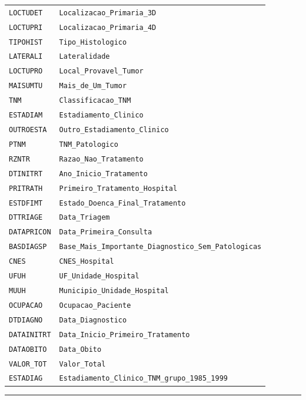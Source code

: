 \documentclass[
  brazilian,
  a4paper,
  oneside]{scrbook}
\begin{document}
\begin{longtable}[]{@{}ll@{}}
\texttt{LOCTUDET} & \texttt{Localizacao\_Primaria\_3D} \\
\texttt{LOCTUPRI} & \texttt{Localizacao\_Primaria\_4D} \\
\texttt{TIPOHIST} & \texttt{Tipo\_Histologico} \\
\texttt{LATERALI} & \texttt{Lateralidade} \\
\texttt{LOCTUPRO} & \texttt{Local\_Provavel\_Tumor} \\
\texttt{MAISUMTU} & \texttt{Mais\_de\_Um\_Tumor} \\
\texttt{TNM} & \texttt{Classificacao\_TNM} \\
\texttt{ESTADIAM} & \texttt{Estadiamento\_Clinico} \\
\texttt{OUTROESTA} & \texttt{Outro\_Estadiamento\_Clinico} \\
\texttt{PTNM} & \texttt{TNM\_Patologico} \\
\texttt{RZNTR} & \texttt{Razao\_Nao\_Tratamento} \\
\texttt{DTINITRT} & \texttt{Ano\_Inicio\_Tratamento} \\
\texttt{PRITRATH} & \texttt{Primeiro\_Tratamento\_Hospital} \\
\texttt{ESTDFIMT} & \texttt{Estado\_Doenca\_Final\_Tratamento} \\
\texttt{DTTRIAGE} & \texttt{Data\_Triagem} \\
\texttt{DATAPRICON} & \texttt{Data\_Primeira\_Consulta} \\
\texttt{BASDIAGSP} &
\texttt{Base\_Mais\_Importante\_Diagnostico\_Sem\_Patologicas} \\
\texttt{CNES} & \texttt{CNES\_Hospital} \\
\texttt{UFUH} & \texttt{UF\_Unidade\_Hospital} \\
\texttt{MUUH} & \texttt{Municipio\_Unidade\_Hospital} \\
\texttt{OCUPACAO} & \texttt{Ocupacao\_Paciente} \\
\texttt{DTDIAGNO} & \texttt{Data\_Diagnostico} \\
\texttt{DATAINITRT} & \texttt{Data\_Inicio\_Primeiro\_Tratamento} \\
\texttt{DATAOBITO} & \texttt{Data\_Obito} \\
\texttt{VALOR\_TOT} & \texttt{Valor\_Total} \\
\texttt{ESTADIAG} &
\texttt{Estadiamento\_Clinico\_TNM\_grupo\_1985\_1999} \\
\end{longtable}

\begin{center}\rule{0.5\linewidth}{0.5pt}\end{center}
\end{document}
